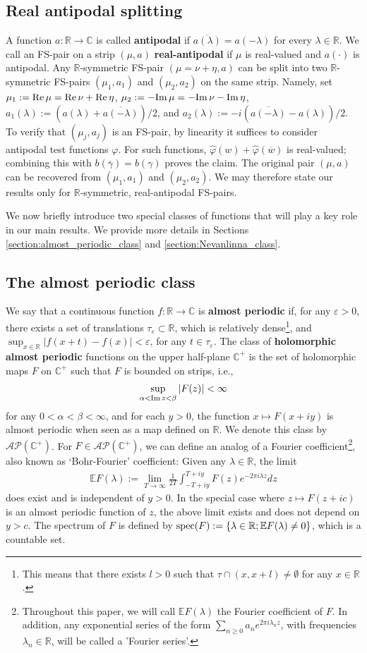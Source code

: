 \documentclass[a4paper,reqno,12pt]{amsart}
\newcommand{\A}{\mathcal{A}}
\renewcommand{\P}{\mathcal{P}}
\renewcommand{\r}{\mathbb{R}}
\newcommand{\cp}{\mathbb{C}} %
\newcommand{\ft}{\widehat}
\newcommand{\la}{\lambda}
\newcommand{\ga}{\gamma}
\newcommand{\al}{\alpha}
\newcommand{\ep}{\varepsilon}
\newcommand{\p}{\varphi}
\newcommand{\ov}[1]{\overline{#1}}
\newcommand{\1}{{\bf 1}}
\newcommand{\ra}{\rightarrow}
\newcommand{\e}{\mathbb{E}}
\newcommand{\mt}{\mapsto}
\renewcommand{\Re}{{\rm Re}\,}
\renewcommand{\Im}{{\rm Im}\,}
\newcommand{\spec}{{\rm spec}}
\begin{document}
\subsection*{Real antipodal splitting} A function $a:\r\ra\cp$ is called \textbf{antipodal} if $\ov{a(\la)}=a(-\la)$ for every $\la\in\r$. We call an FS-pair on a strip $(\mu,a)$ \textbf{real-antipodal} if $\mu$ is real-valued and $a(\cdot)$ is antipodal. Any $\r$-symmetric FS-pair $(\mu=\nu+\eta,a)$ can be split into two $\r$-symmetric FS-pairs $(\mu_1,a_1)$ and $(\mu_2,a_2)$ on the same strip. Namely, set $\mu_1:=\Re{\mu}=\Re{\nu}+\Re{\eta}$, $\mu_2:=-\Im{\mu}=-\Im{\nu}-\Im{\eta}$, $a_1(\la):=\left(a(\la)+\ov{a(-\la)}\right)/2$, and $a_2(\la):=-i\left(\ov{a(-\la)}-a(\la)\right)/2$. To verify that $(\mu_j,a_j)$ is an FS-pair, by linearity it suffices to consider antipodal test functions $\p$. For such functions, $\ft{\p}(w)+\ft{\p}(\ov{w})$ is real-valued; combining this with $b(\ov{\ga})=b(\ga)$ proves the claim. The original pair $(\mu,a)$ can be recovered from $(\mu_1,a_1)$ and $(\mu_2,a_2)$. We may therefore state our results only for $\r$-symmetric, real-antipodal FS-pairs.

We now briefly introduce two special classes of functions that will play a key role in our main results. We provide more details in Sections \ref{section:almost_periodic_class} and \ref{section:Nevanlinna_class}.
\subsection*{The almost periodic class} We say that a continuous function $f:\r\ra\cp$ is \textbf{almost periodic} if, for any $\ep>0$, there exists a set of translations $\tau_\ep\subset\r$, which is relatively dense\footnote{This means that there exists $l>0$ such that $\tau\cap(x,x+l)\neq\emptyset$ for any $x\in\r$.}, and $\sup_{x\in\r} {|f(x+t)-f(x)|}<\ep$, for any $t\in\tau_{\ep}$. The class of \textbf{holomorphic almost periodic} functions on the upper half-plane $\cp^+$ is the set of holomorphic maps $F$ on $\cp^+$ such that $F$ is bounded on strips, i.e., 
\begin{align*}
    \sup_{\al<\Im{z}<\beta} |F(z)|<\infty
\end{align*}
for any $0<\al<\beta<\infty$, and for each $y>0$, the function $x\mt F(x+iy)$ is almost periodic when seen as a map defined on $\r$. We denote this class by $\A\P(\cp^+)$.
For $F\in\A\P(\cp^+)$, we can define an analog of a Fourier coefficient\footnote{Throughout this paper, we will call $\e F(\la)$ the Fourier coefficient of $F$. In addition, any exponential series of the form $\sum_{n\geq0} a_n e^{2\pi i\la_n z}$, with frequencies $\la_n\in\r$, will be called a 'Fourier series'.}, also known as `Bohr-Fourier' coefficient: Given any $\la\in\r$, the limit
\begin{align*}
\e F(\la):=\lim_{T\ra\infty} \frac{1}{2T} \int_{-T+iy}^{T+iy} F(z)e^{-2\pi i\la z}dz
\end{align*}
does exist and is independent of $y>0$. In the special case where $z\mt F(z+ic)$ is an almost periodic function of $z$, the above limit exists and does not depend on $y>c$. The spectrum of $F$ is defined by $\spec(F):=\{\la\in\r;\e F(\la)\neq0\}$, which is a countable set.
\end{document}

